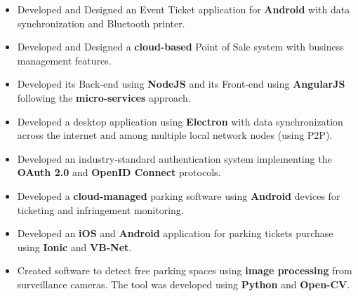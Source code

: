 \documentclass[10pt,a4paper,ragged2e]{altacv}
\begin{document}
\divider%

\begin{itemize}
\item Developed and Designed an Event Ticket application for \textbf{Android} with data synchronization and Bluetooth printer.
\item Developed and Designed a \textbf{cloud-based} Point of Sale system with business management features.
\item Developed its Back-end using \textbf{NodeJS} and its Front-end using \textbf{AngularJS} following the \textbf{micro-services} approach.
\item Developed a desktop application using \textbf{Electron} with data synchronization across the internet and among multiple local network nodes (using P2P).
\item Developed an industry-standard authentication system implementing the \textbf{OAuth 2.0} and \textbf{OpenID Connect} protocols.
\end{itemize}

\divider%

\begin{itemize}
\item Developed a \textbf{cloud-managed} parking software using \textbf{Android} devices for ticketing and infringement monitoring.  
\item Developed an \textbf{iOS} and \textbf{Android} application for parking tickets purchase using \textbf{Ionic} and \textbf{VB-Net}.
\item Created software to detect free parking spaces using \textbf{image processing} from surveillance cameras. The tool was developed using \textbf{Python} and \textbf{Open-CV}\@.
\end{itemize}

\clearpage


\divider%

\end{document}
